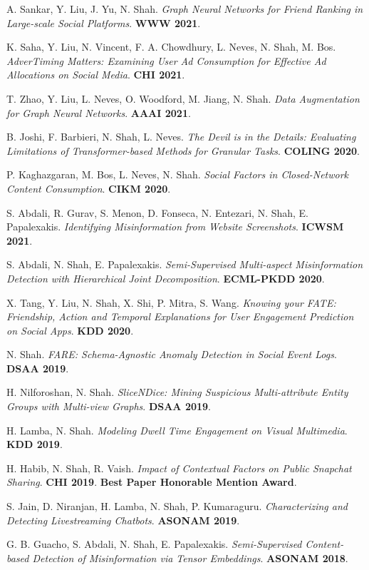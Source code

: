 \documentclass{article}
\begin{document}
\begin{etaremune}[itemsep=1pt,parsep=0pt]
\item A. Sankar, Y. Liu, J. Yu, N. Shah. \emph{Graph Neural Networks for Friend Ranking in Large-scale Social Platforms}. \textbf{WWW 2021}.
\item K. Saha, Y. Liu, N. Vincent, F. A. Chowdhury, L. Neves, N. Shah, M. Bos. \emph{AdverTiming Matters: Examining User Ad Consumption for Effective Ad Allocations on Social Media}. \textbf{CHI 2021}.
\item T. Zhao, Y. Liu, L. Neves, O. Woodford, M. Jiang, N. Shah. \emph{Data Augmentation for Graph Neural Networks}. \textbf{AAAI 2021}.
\item B. Joshi, F. Barbieri, N. Shah, L. Neves. \emph{The Devil is in the Details: Evaluating Limitations of Transformer-based Methods for Granular Tasks}. \textbf{COLING 2020}.
\item P. Kaghazgaran, M. Bos, L. Neves, N. Shah. \emph{Social Factors in Closed-Network Content Consumption}. \textbf{CIKM 2020}.
\item S. Abdali, R. Gurav, S. Menon, D. Fonseca, N. Entezari, N. Shah, E. Papalexakis. \emph{Identifying Misinformation from Website Screenshots}. \textbf{ICWSM 2021}.
\item S. Abdali, N. Shah, E. Papalexakis. \emph{Semi-Supervised Multi-aspect Misinformation Detection with Hierarchical Joint Decomposition}. \textbf{ECML-PKDD 2020}.
\item X. Tang, Y. Liu, N. Shah, X. Shi, P. Mitra, S. Wang. \emph{Knowing your FATE: Friendship, Action and Temporal Explanations for User Engagement Prediction on Social Apps}. \textbf{KDD 2020}.
\item N. Shah. \emph{FARE: Schema-Agnostic Anomaly Detection in Social Event Logs}. \textbf{DSAA 2019}.
\item H. Nilforoshan, N. Shah. \emph{SliceNDice: Mining Suspicious Multi-attribute Entity Groups with Multi-view Graphs}. \textbf{DSAA 2019}.
\item H. Lamba, N. Shah. \emph{Modeling Dwell Time Engagement on Visual Multimedia}. \textbf{KDD 2019}.
\item H. Habib, N. Shah, R. Vaish. \emph{Impact of Contextual Factors on Public Snapchat Sharing}. \textbf{CHI 2019}. \textbf{Best Paper Honorable Mention Award}.
\item S. Jain, D. Niranjan, H. Lamba, N. Shah, P. Kumaraguru. \emph{Characterizing and Detecting Livestreaming Chatbots}. \textbf{ASONAM 2019}.
\item G. B. Guacho, S. Abdali, N. Shah, E. Papalexakis. \emph{Semi-Supervised Content-based Detection of Misinformation via Tensor Embeddings}. \textbf{ASONAM 2018}.

\end{etaremune}
\end{document}
